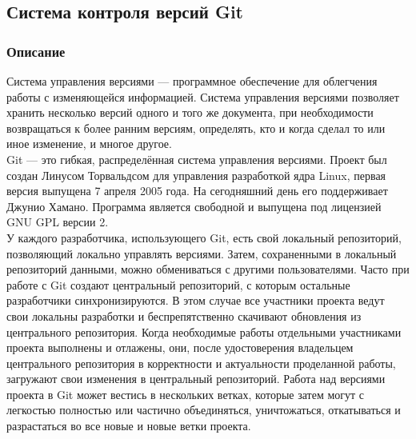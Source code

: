 \documentclass{article}
\begin{document}
	\subsection{Система контроля версий Git}
		\subsubsection{Описание}
		Система управления версиями — программное обеспечение для облегчения работы с изменяющейся информацией. Система управления версиями позволяет хранить несколько версий одного и того же документа, при необходимости возвращаться к более ранним версиям, определять, кто и когда сделал то или иное изменение, и многое другое.\\
		
		Git — это гибкая, распределённая система управления версиями. Проект был создан Линусом Торвальдсом для управления разработкой ядра Linux, первая версия выпущена 7 апреля 2005 года. На сегодняшний день его поддерживает Джунио Хамано. Программа является свободной и выпущена под лицензией GNU GPL версии 2.\\ 
		
	У каждого разработчика, использующего Git, есть свой локальный репозиторий, позволяющий локально управлять версиями. Затем, сохраненными в локальный репозиторий данными, можно обмениваться с другими пользователями. Часто при работе с Git создают центральный репозиторий, с которым остальные разработчики синхронизируются. В этом случае все участники проекта ведут свои локальны разработки и беспрепятственно скачивают обновления из центрального репозитория. Когда необходимые работы отдельными участниками проекта выполнены и отлажены, они, после удостоверения владельцем центрального репозитория в корректности и актуальности проделанной работы, загружают свои изменения в центральный репозиторий. Работа над версиями проекта в Git может вестись в нескольких ветках, которые затем могут с легкостью полностью или частично объединяться, уничтожаться, откатываться и разрастаться во все новые и новые ветки проекта.\\
\end{document}

